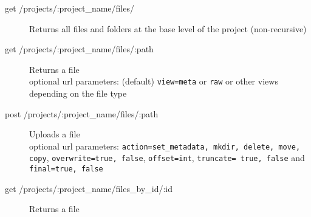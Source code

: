 \begin{description}
\item[get	/projects/:project\_name/files/] Returns all files and folders at the base level of the project (non-recursive)
\item[get	/projects/:project\_name/files/:path] Returns a file\\
optional url parameters: (default) \texttt{view=meta} or \texttt{raw} or other views depending on the file type
\item[post	/projects/:project\_name/files/:path] Uploads a file\\
optional url parameters: \texttt{action=set\_metadata, mkdir, delete, move, copy}, \texttt{overwrite=true, false}, \texttt{offset=int}, \texttt{truncate= true, false} and \texttt{final=true, false}
\item[get	/projects/:project\_name/files\_by\_id/:id] Returns a file
\end{description}